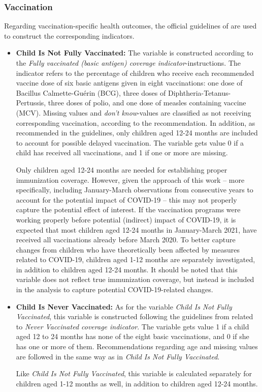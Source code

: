 \documentclass[12pt,a4paper,notitlepage]{article}
\begin{document}
\subsubsection{Vaccination} \label{subsubsec:vaccination}

Regarding vaccination-specific health outcomes, the official guidelines of \citet{who2019Vaccination} are used to construct the corresponding indicators.

\begin{itemize}
    \item \textbf{Child Is Not Fully Vaccinated:} The variable is constructed according to the \textit{Fully vaccinated (basic antigen) coverage indicator}-instructions. The indicator refers to the percentage of children who receive each recommended vaccine dose of six basic antigens given in eight vaccinations: one dose of Bacillus Calmette-Guérin (BCG), three doses of Diphtheria-Tetanus-Pertussis, three doses of polio, and one dose of measles containing vaccine (MCV). Missing values and \textit{don't know}-values are classified as not receiving corresponding vaccination, according to the recommendation. In addition, as recommended in the guidelines, only children aged 12-24 months are included to account for possible delayed vaccination. The variable gets value 0 if a child has received  all vaccinations, and 1 if one or more are missing.

    Only children aged 12-24 months are needed for establishing proper immunization coverage. However, given the approach of this work -- more specifically, including January-March observations from consecutive years to account for the potential impact of COVID-19 -- this may not properly capture the potential effect of interest. If the vaccination programs were working properly before potential (indirect) impact of COVID-19, it is expected that most children aged 12-24 months in January-March 2021, have received all vaccinations already before March 2020. To better capture changes from children who have theoretically been affected by measures related to COVID-19, children aged 1-12 months are separately investigated, in addition to children aged 12-24 months. It should be noted that this variable does not reflect true immunization coverage, but instead is included in the analysis to capture potential COVID-19-related changes.

    \item \textbf{Child Is Never Vaccinated:} As for the variable \textit{Child Is Not Fully Vaccinated}, this variable is constructed following the guidelines from \cite{who2019Vaccination} related to \textit{Never Vaccinated coverage indicator}. The variable gets value 1 if a child aged 12 to 24 months has none of the eight basic vaccinations, and 0 if she has one or more of them. Recommendations regarding age and missing values are followed in the same way as in \textit{Child Is Not Fully Vaccinated}.

    Like \textit{Child Is Not Fully Vaccinated}, this variable is calculated separately for children aged 1-12 months as well, in addition to children aged 12-24 months.
\end{itemize}
\end{document}
